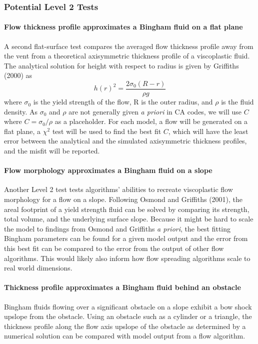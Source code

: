 \documentclass[12pt,letter]{article}
\begin{document}
		\subsubsection{Potential Level 2 Tests}
			\paragraph{Flow thickness profile approximates a Bingham fluid on a flat plane}
				A second flat-surface test compares the averaged flow thickness profile away from the vent from a theoretical axisymmetric thickness profile of a viscoplastic fluid. The analytical solution for height with respect to radius is given by Griffiths (2000) as
				\begin{equation}
					h(r)^2 = \frac{2\sigma_0(R-r)}{\rho g}
				\end{equation}
				where $\sigma_0$ is the yield strength of the flow, R is the outer radius, and $\rho$ is the fluid density. As $\sigma_0$ and $\rho$ are not generally given \textit{a priori} in CA codes, we will use $C$ where $C=\sigma_0/\rho$ as a placeholder. For each model, a flow will be generated on a flat plane, a $\chi^2$ test will be used to find the best fit $C$, which will have the least error between the analytical and the simulated axisymmetric thickness profiles, and the misfit will be reported.

			\paragraph{Flow morphology approximates a Bingham fluid on a slope}
				Another Level 2 test tests algorithms' abilities to recreate viscoplastic flow morphology for a flow on a slope. Following Osmond and Griffiths (2001), the areal footprint of a yield strength fluid can be solved by comparing its strength, total volume, and the underlying surface slope. Because it might be hard to scale the model to findings from Osmond and Griffiths \textit{a priori}, the best fitting Bingham parameters can be found for a given model output and the error from this best fit can be compared to the error from the output of other flow algorithms. This would likely also inform how flow spreading algorithms scale to real world dimensions.

			\paragraph{Thickness profile approximates a Bingham fluid behind an obstacle}
				Bingham fluids flowing over a significant obstacle on a slope exhibit a bow shock upslope from the obstacle. Using an obstacle such as a cylinder or a triangle, the thickness profile along the flow axis upslope of the obstacle as determined by a numerical solution can be compared with model output from a flow algorithm.
\end{document}
